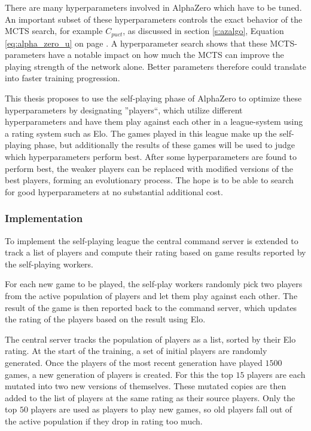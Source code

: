 \documentclass[12pt,onecolumn,oneside,titlepage]{article}
\begin{document}
There are many hyperparameters involved in AlphaZero which have to be tuned. An important subset of these hyperparameters controls the exact behavior of the MCTS search, for example $C_{puct}$, as discussed in section \ref{s:azalgo}, Equation \ref{eq:alpha_zero_u} on page \pageref{eq:alpha_zero_u}.
A hyperparameter search shows that these MCTS-parameters have a notable impact on how much the MCTS can improve the playing strength of the network alone. Better parameters therefore could translate into faster training progression.

This thesis proposes to use the self-playing phase of AlphaZero to optimize these hyperparameters by designating ''players``, which utilize different hyperparameters and have them play against each other in a league-system using a rating system such as Elo. The games played 
in this league make up the self-playing phase, but additionally the results of these games will be used to judge which hyperparameters perform best. After some hyperparameters are found to perform best, the weaker players can be replaced with modified versions 
of the best players, forming an evolutionary process. The hope is to be able to search for good hyperparameters at no substantial additional cost.

\subsubsection{Implementation}

To implement the self-playing league the central command server is extended to track a list of players and compute their rating based on game results reported by the self-playing workers.

For each new game to be played, the self-play workers randomly pick two players from the active population of players and let them play against each other. The result of the game is then reported back to the command server, which updates the rating of the players based on the result using Elo.

The central server tracks the population of players as a list, sorted by their Elo rating. 
At the start of the training, a set of initial players are randomly generated.
Once the players of the most recent generation have played $1500$ games, a new generation of players is created. For this the top $15$ players are each mutated into two new versions of themselves. These mutated copies are then added to the list of players at the same rating as their source players.
Only the top $50$ players are used as players to play new games, so old players fall out of the active population if they drop in rating too much.
\end{document}
